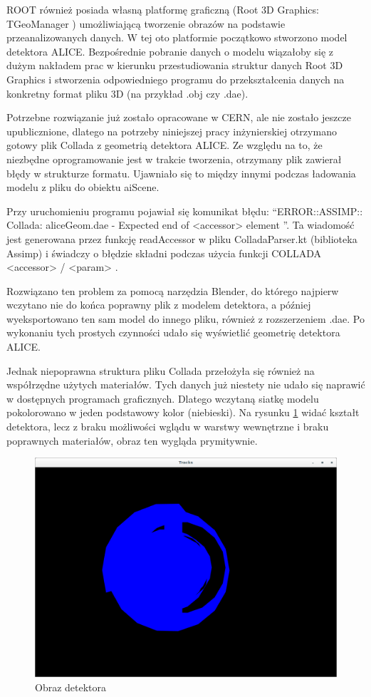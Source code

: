 ROOT również posiada własną platformę graficzną (Root 3D Graphics: TGeoManager \cite{root3dGraphics}) umożliwiającą tworzenie obrazów na podstawie przeanalizowanych danych. W tej oto platformie początkowo stworzono model detektora ALICE. Bezpośrednie pobranie danych o modelu wiązałoby się z dużym nakładem prac w kierunku przestudiowania struktur danych Root 3D Graphics i stworzenia odpowiedniego programu do przekształcenia danych na konkretny format pliku 3D (na przykład .obj czy .dae). 

Potrzebne rozwiązanie już zostało opracowane w CERN, ale nie zostało jeszcze upublicznione, dlatego na potrzeby niniejszej pracy inżynierskiej otrzymano gotowy plik Collada z geometrią detektora ALICE. Ze względu na to, że niezbędne oprogramowanie jest w trakcie tworzenia, otrzymany plik zawierał błędy w strukturze formatu. Ujawniało się to między innymi podczas ładowania modelu z pliku do obiektu aiScene. 

Przy uruchomieniu programu pojawiał się komunikat błędu: \textquotedblleft ERROR::ASSIMP:: Collada: aliceGeom.dae - Expected end of <accessor> element \textquotedblright . Ta wiadomość jest generowana przez funkcję readAccessor w pliku ColladaParser.kt (biblioteka Assimp) i świadczy o błędzie składni podczas użycia funkcji COLLADA <accessor> / <param> \cite{collada}.

Rozwiązano ten problem za pomocą narzędzia Blender, do którego najpierw wczytano nie do końca poprawny plik z modelem detektora, a później wyeksportowano ten sam model do innego pliku, również z rozszerzeniem .dae. Po wykonaniu tych prostych czynności udało się wyświetlić geometrię detektora ALICE. 

Jednak niepoprawna struktura pliku Collada przełożyła się również na współrzędne użytych materiałów. Tych danych już niestety nie udało się naprawić w dostępnych programach graficznych. Dlatego wczytaną siatkę modelu pokolorowano w jeden podstawowy kolor (niebieski). Na rysunku \ref{rys28} widać kształt detektora, lecz z braku możliwości wglądu w warstwy wewnętrzne i braku poprawnych materiałów, obraz ten wygląda prymitywnie.

\begin{figure}[H]
		\centering
 		\includegraphics[width=12.0cm]{myGeom.png}
    	\caption{Obraz detektora}
 		\label{rys28}
\end{figure}

